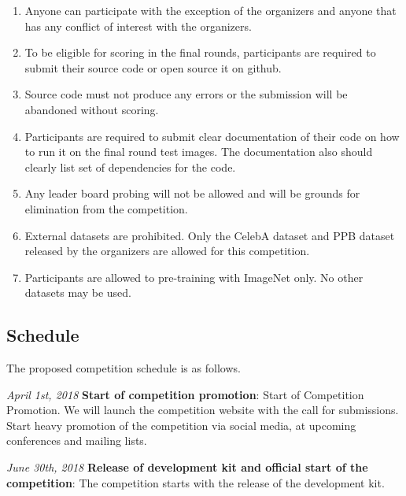 \documentclass[11pt, oneside]{article}
\begin{document}
\begin{enumerate}
    \item Anyone can participate with the exception of the organizers and anyone that has any conflict of interest with the organizers.
    \item To be eligible for scoring in the final rounds, participants are required to submit their source code or open source it on github.
    \item Source code must not produce any errors or the submission will be abandoned without scoring.
    \item Participants are required to submit clear documentation of their code on how to run it on the final round test images. The documentation also should clearly list set of dependencies for the code.
    \item Any leader board probing will not be allowed and will be grounds for elimination from the competition.
    \item External datasets are prohibited.  Only the CelebA dataset and PPB dataset released by the organizers are allowed for this competition.
    \item Participants are allowed to pre-training with ImageNet only.  No other datasets may be used.  
\end{enumerate}

\subsection{Schedule}

The proposed competition schedule is as follows.

{\it April 1st, 2018} {\bf Start of competition promotion}: Start of Competition Promotion. We will launch the competition website with the call for submissions. Start heavy promotion of the competition via social media, at upcoming conferences and mailing lists.

{\it June 30th, 2018} {\bf Release of development kit and official start of the competition}: The competition starts with the release of the development kit. 
\end{document}
